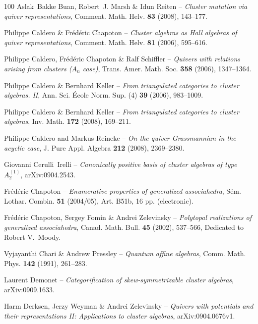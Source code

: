 \documentclass[brochure,12pt]{bourbaki}
\numberwithin{equation}{subsection}
\numberwithin{theorem}{section}
\begin{document}
\begin{thebibliography}{100}
{\sc Aslak~Bakke Buan, Robert~J. Marsh \& Idun Reiten} -- \emph{Cluster mutation via
  quiver representations}, Comment. Math. Helv. \textbf{83} (2008), 
  143--177.

{\sc Philippe Caldero \& Fr{\'e}d{\'e}ric Chapoton} -- \emph{Cluster algebras as
  {H}all algebras of quiver representations}, Comment. Math. Helv. \textbf{81}
  (2006), 595--616.

{\sc Philippe Caldero, Fr\'ed\'eric Chapoton \& Ralf Schiffler} -- \emph{Quivers with
  relations arising from clusters (${A}_n$ case)}, Trans. Amer. Math. Soc.
  \textbf{358} (2006), 1347--1364.

{\sc Philippe Caldero \& Bernhard Keller} -- \emph{From triangulated categories to
  cluster algebras. {II}}, Ann. Sci. \'Ecole Norm. Sup. (4) \textbf{39} (2006),
  983--1009.

{\sc Philippe Caldero \& Bernhard Keller} -- \emph{From triangulated categories to
  cluster algebras}, Inv. Math. \textbf{172} (2008), 169--211.

{\sc Philippe Caldero and Markus Reineke} -- \emph{On the quiver {G}rassmannian in the
  acyclic case}, J. Pure Appl. Algebra \textbf{212} (2008), 2369--2380.

{\sc Giovanni Cerulli~Irelli} -- \emph{Canonically positive basis of cluster algebras
  of type {$A_2^{(1)}$}}, arXiv:0904.2543.


{\sc Fr{\'e}d{\'e}ric Chapoton} -- \emph{Enumerative properties of generalized
  associahedra}, S\'em. Lothar. Combin. \textbf{51} (2004/05), Art. B51b, 16
  pp. (electronic).

{\sc Fr{\'e}d{\'e}ric Chapoton, Sergey Fomin \& Andrei Zelevinsky} -- \emph{Polytopal
  realizations of generalized associahedra}, Canad. Math. Bull. \textbf{45}
  (2002), 537--566, Dedicated to Robert V.\ Moody.

{\sc Vyjayanthi Chari \& Andrew Pressley} -- \emph{Quantum affine algebras}, Comm.
  Math. Phys. \textbf{142} (1991), 261--283.

{\sc Laurent Demonet} -- \emph{Categorification of skew-symmetrizable cluster
  algebras}, arXiv:0909.1633.

{\sc Harm Derksen, Jerzy Weyman \& Andrei Zelevinsky} -- \emph{Quivers with
  potentials and their representations {II}: {Applications to cluster
  algebras}}, arXiv:0904.0676v1.


\end{thebibliography}
\end{document}
